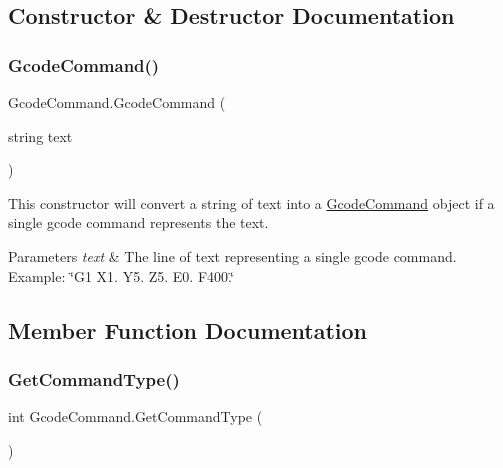 \subsection{Constructor \& Destructor Documentation}
\mbox{\label{class_gcode_command_aefd8e6144be3153471b2ee5e5fc500de}} 
\subsubsection{\texorpdfstring{Gcode\+Command()}{GcodeCommand()}}
{\footnotesize\ttfamily Gcode\+Command.\+Gcode\+Command (\begin{DoxyParamCaption}\item[{string}]{text }\end{DoxyParamCaption})}



This constructor will convert a string of text into a \hyperlink{class_gcode_command}{Gcode\+Command} object if a single gcode command represents the text. 


\begin{DoxyParams}{Parameters}
{\em text} & The line of text representing a single gcode command. Example\+: \char`\"{}\+G1 X1. Y5. Z5. E0. F400.\char`\"{}\\
\hline
\end{DoxyParams}


\subsection{Member Function Documentation}
\mbox{\label{class_gcode_command_ad40c68e4595b030959155c66fb66f154}} 
\subsubsection{\texorpdfstring{Get\+Command\+Type()}{GetCommandType()}}
{\footnotesize\ttfamily int Gcode\+Command.\+Get\+Command\+Type (\begin{DoxyParamCaption}{ }\end{DoxyParamCaption})}



